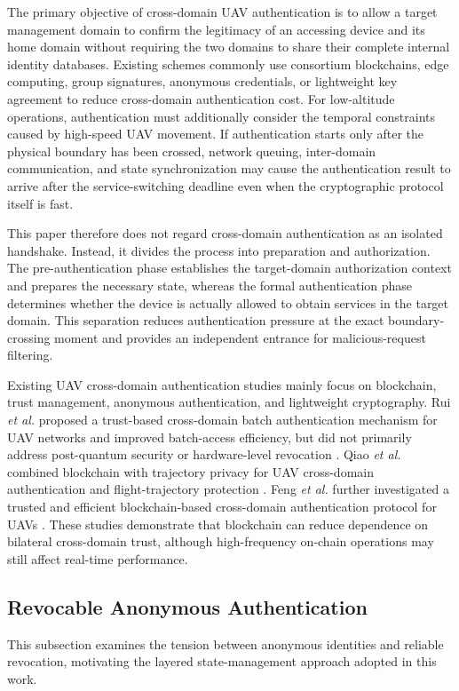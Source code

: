 \documentclass[lettersize,journal]{IEEEtran}
\begin{document}
	
	The primary objective of cross-domain UAV authentication is to allow a target management domain to confirm the legitimacy of an accessing device and its home domain without requiring the two domains to share their complete internal identity databases. Existing schemes commonly use consortium blockchains, edge computing, group signatures, anonymous credentials, or lightweight key agreement to reduce cross-domain authentication cost. For low-altitude operations, authentication must additionally consider the temporal constraints caused by high-speed UAV movement. If authentication starts only after the physical boundary has been crossed, network queuing, inter-domain communication, and state synchronization may cause the authentication result to arrive after the service-switching deadline even when the cryptographic protocol itself is fast.
	
	This paper therefore does not regard cross-domain authentication as an isolated handshake. Instead, it divides the process into preparation and authorization. The pre-authentication phase establishes the target-domain authorization context and prepares the necessary state, whereas the formal authentication phase determines whether the device is actually allowed to obtain services in the target domain. This separation reduces authentication pressure at the exact boundary-crossing moment and provides an independent entrance for malicious-request filtering.
	
	Existing UAV cross-domain authentication studies mainly focus on blockchain, trust management, anonymous authentication, and lightweight cryptography. Rui \emph{et al.} proposed a trust-based cross-domain batch authentication mechanism for UAV networks and improved batch-access efficiency, but did not primarily address post-quantum security or hardware-level revocation \cite{b1}. Qiao \emph{et al.} combined blockchain with trajectory privacy for UAV cross-domain authentication and flight-trajectory protection \cite{b2}. Feng \emph{et al.} further investigated a trusted and efficient blockchain-based cross-domain authentication protocol for UAVs \cite{b21}. These studies demonstrate that blockchain can reduce dependence on bilateral cross-domain trust, although high-frequency on-chain operations may still affect real-time performance.
	
	\subsection{Revocable Anonymous Authentication}
	This subsection examines the tension between anonymous identities and reliable revocation, motivating the layered state-management approach adopted in this work.
	
\end{document}
